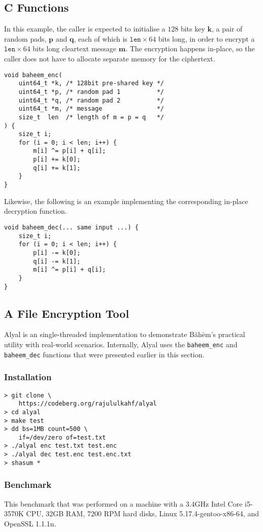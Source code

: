 \documentclass[twocolumn,hidelinks]{article}
\newcommand{\baheem}{Băhēm}
\begin{document}
\subsection{C Functions}
In this example, the caller is expected to initialise a $128$ bits key
$\mathbf{k}$, a pair of random pads, $\mathbf{p}$ and $\mathbf{q}$, each of
which is $\mathtt{len} \times 64$ bits long, in order to encrypt a
$\mathtt{len} \times 64$ bits long cleartext message $\mathbf{m}$.  The
encryption happens in-place, so the caller does not have to allocate
separate memory for the ciphertext.
\begin{verbatim}
void baheem_enc(
    uint64_t *k, /* 128bit pre-shared key */
    uint64_t *p, /* random pad 1          */
    uint64_t *q, /* random pad 2          */
    uint64_t *m, /* message               */
    size_t  len  /* length of m = p = q   */
) {
    size_t i;
    for (i = 0; i < len; i++) {
        m[i] ^= p[i] + q[i];
        p[i] += k[0];
        q[i] += k[1];
    }
}
\end{verbatim}
Likewise, the following is an example implementing the corresponding
in-place decryption function.
\begin{verbatim}
void baheem_dec(... same input ...) {
    size_t i;
    for (i = 0; i < len; i++) {
        p[i] -= k[0];
        q[i] -= k[1];
        m[i] ^= p[i] + q[i];
    }
}
\end{verbatim}


\subsection{A File Encryption Tool}
Alyal is an single-threaded implementation to demonstrate \baheem's
practical utility with real-world scenarios.  Internally, Alyal uses the
\texttt{baheem\_enc} and \texttt{baheem\_dec} functions that were presented
earlier in this section.

\subsubsection{Installation}
\begin{verbatim}
> git clone \
    https://codeberg.org/rajululkahf/alyal
> cd alyal
> make test
> dd bs=1MB count=500 \
    if=/dev/zero of=test.txt
> ./alyal enc test.txt test.enc
> ./alyal dec test.enc test.enc.txt
> shasum *
\end{verbatim}

\subsubsection{Benchmark}
This benchmark that was performed on a machine with a 3.4GHz Intel Core
i5-3570K CPU, 32GB RAM, 7200 RPM hard disks, Linux 5.17.4-gentoo-x86-64,
and OpenSSL 1.1.1n.
\end{document}
